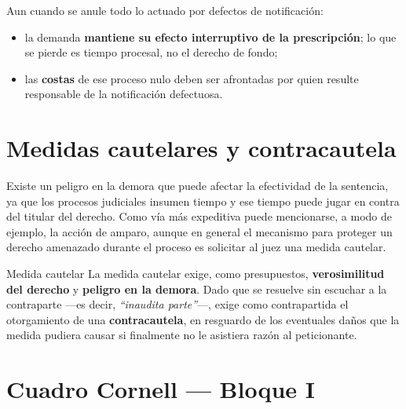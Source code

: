\documentclass[12pt,oneside]{book}
\begin{document}
\begin{important}
Aun cuando se anule todo lo actuado por defectos de notificación:
\begin{itemize}
    \item la demanda \textbf{mantiene su efecto interruptivo de la prescripción}; lo que se pierde es tiempo procesal, no el derecho de fondo;
    \item las \textbf{costas} de ese proceso nulo deben ser afrontadas por quien resulte responsable de la notificación defectuosa.
\end{itemize}
\end{important}

\section{Medidas cautelares y contracautela}

Existe un peligro en la demora que puede afectar la efectividad de la sentencia, ya que los procesos judiciales insumen tiempo y ese tiempo puede jugar en contra del titular del derecho. Como vía más expeditiva puede mencionarse, a modo de ejemplo, la acción de amparo, aunque en general el mecanismo para proteger un derecho amenazado durante el proceso es solicitar al juez una medida cautelar.

\begin{definition}{Medida cautelar}
La medida cautelar exige, como presupuestos, \textbf{verosimilitud del derecho} y \textbf{peligro en la demora}. Dado que se resuelve sin escuchar a la contraparte —es decir, \textit{``inaudita parte''}—, exige como contrapartida el otorgamiento de una \textbf{contracautela}, en resguardo de los eventuales daños que la medida pudiera causar si finalmente no le asistiera razón al peticionante.
\end{definition}

\section*{Cuadro Cornell — Bloque I}
\end{document}
